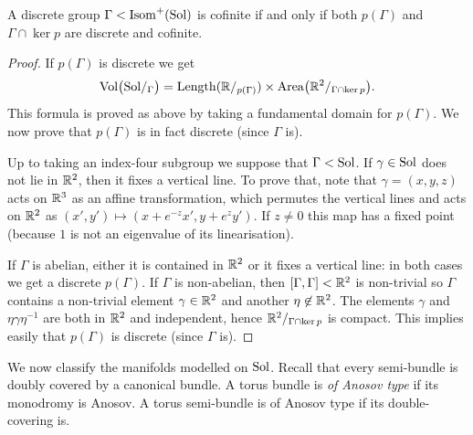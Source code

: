 \begin{prop}
A discrete group $\Gamma < {\rm Isom}^+({\rm Sol})$ is cofinite if and only if both $p(\Gamma)$ and $\Gamma \cap \ker p$ are discrete and cofinite.
\end{prop}
\begin{proof}
If $p(\Gamma)$ is discrete we get
$${\rm Vol} \big({\rm Sol}/_\Gamma \big) = {\rm Length}(\mathbb{R}/_{p(\Gamma)}) \times {\rm Area}\big(\mathbb{R}^2/ _{\Gamma \cap \ker p}\big). $$
This formula is proved as above by taking a fundamental domain for $p(\Gamma)$. We now prove that $p(\Gamma)$ is in fact discrete (since $\Gamma$ is).

Up to taking an index-four subgroup we suppose that $\Gamma < {\rm Sol}$. 
If $\gamma \in {\rm Sol}$ does not lie in $\mathbb{R}^2$, then it fixes a vertical line. To prove that, note that $\gamma = (x,y,z)$ acts on $\mathbb{R}^3$ as an affine transformation, which permutes the vertical lines and acts on $\mathbb{R}^2$ as $(x',y') \mapsto (x+e^{-z}x', y+e^zy')$. If $z \neq 0$ this map has a fixed point (because $1$ is not an eigenvalue of its linearisation).

If $\Gamma$ is abelian, either it is contained in $\mathbb{R}^2$ or it fixes a vertical line: in both cases we get a discrete $p(\Gamma)$. If $\Gamma$ is non-abelian, then $[\Gamma, \Gamma]<\mathbb{R}^2$ is non-trivial so $\Gamma$ contains a non-trivial element $\gamma \in \mathbb{R}^2$ and another $\eta \not \in \mathbb{R}^2$. The elements $\gamma$ and $\eta\gamma\eta^{-1}$ are both in $\mathbb{R}^2$ and independent, hence $\mathbb{R}^2 /_{\Gamma \cap \ker p}$ is compact. This implies easily that $p(\Gamma)$ is discrete (since $\Gamma$ is).
\end{proof}

We now classify the manifolds modelled on ${\rm Sol}$. Recall that every semi-bundle is doubly covered by a canonical bundle. A torus bundle is \emph{of Anosov type} if its monodromy is Anosov. A torus semi-bundle is of Anosov type if its double-covering is.

